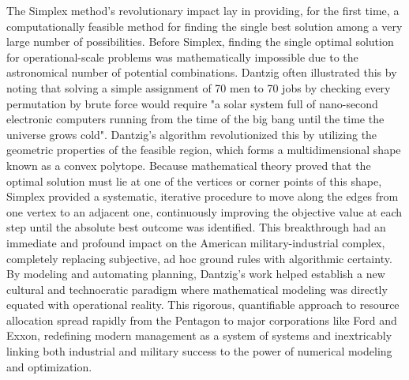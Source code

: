 The Simplex method's revolutionary impact lay in providing, for the first time, a computationally feasible method for finding the single best solution among a very large number of possibilities. Before Simplex, finding the single optimal solution for operational-scale problems was mathematically impossible due to the astronomical number of potential combinations. Dantzig often illustrated this by noting that solving a simple assignment of 70 men to 70 jobs by checking every permutation by brute force would require "a solar system full of nano-second electronic computers running from the time of the big bang until the time the universe grows cold". Dantzig's algorithm revolutionized this by utilizing the geometric properties of the feasible region, which forms a multidimensional shape known as a convex polytope. Because mathematical theory proved that the optimal solution must lie at one of the vertices or corner points of this shape, Simplex provided a systematic, iterative procedure to move along the edges from one vertex to an adjacent one, continuously improving the objective value at each step until the absolute best outcome was identified. This breakthrough had an immediate and profound impact on the American military-industrial complex, completely replacing subjective, ad hoc ground rules with algorithmic certainty. By modeling and automating planning, Dantzig's work helped establish a new cultural and technocratic paradigm where mathematical modeling was directly equated with operational reality. This rigorous, quantifiable approach to resource allocation spread rapidly from the Pentagon to major corporations like Ford and Exxon, redefining modern management as a system of systems and inextricably linking both industrial and military success to the power of numerical modeling and optimization. 

